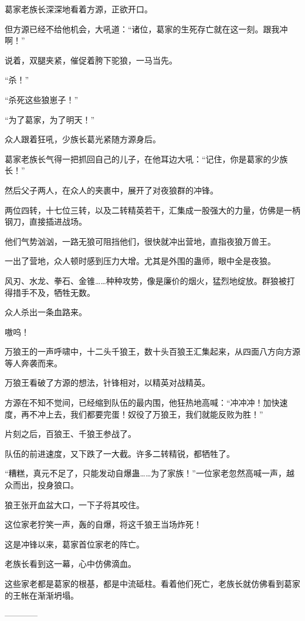 \begin{this_body}
葛家老族长深深地看着方源，正欲开口。

但方源已经不给他机会，大吼道：“诸位，葛家的生死存亡就在这一刻。跟我冲啊！”

说着，双腿夹紧，催促着胯下驼狼，一马当先。

“杀！”

“杀死这些狼崽子！”

“为了葛家，为了明天！”

众人跟着狂吼，少族长葛光紧随方源身后。

葛家老族长气得一把抓回自己的儿子，在他耳边大吼：“记住，你是葛家的少族长！”

然后父子两人，在众人的夹裹中，展开了对夜狼群的冲锋。

两位四转，十七位三转，以及二转精英若干，汇集成一股强大的力量，仿佛是一柄钢刀，直接插进战场。

他们气势汹汹，一路无狼可阻挡他们，很快就冲出营地，直指夜狼万兽王。

一出了营地，众人顿时感到压力大增。尤其是外围的蛊师，眼中全是夜狼。

风刃、水龙、拳石、金锥……种种攻势，像是廉价的烟火，猛烈地绽放。群狼被打得措手不及，牺牲无数。

众人杀出一条血路来。

嗷呜！

万狼王的一声呼啸中，十二头千狼王，数十头百狼王汇集起来，从四面八方向方源等人奔袭而来。

万狼王看破了方源的想法，针锋相对，以精英对战精英。

方源在不知不觉间，已经缩到队伍的最内围，他狂热地高喊：“冲冲冲！加快速度，再不冲上去，我们都要完蛋！奴役了万狼王，我们就能反败为胜！”

片刻之后，百狼王、千狼王参战了。

队伍的前进速度，又下跌了一大截。许多二转精锐，都牺牲了。

“糟糕，真元不足了，只能发动自爆蛊……为了家族！”一位家老忽然高喊一声，越众而出，投身狼口。

狼王张开血盆大口，一下子将其咬住。

这位家老狞笑一声，轰的自爆，将这千狼王当场炸死！

这是冲锋以来，葛家首位家老的阵亡。

老族长看到这一幕，心中仿佛滴血。

这些家老都是葛家的根基，都是中流砥柱。看着他们死亡，老族长就仿佛看到葛家的王帐在渐渐坍塌。

------------

\end{this_body}

